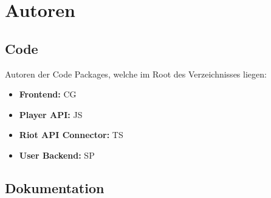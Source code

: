 \section{Autoren}
\subsection{Code}
Autoren der Code Packages, welche im Root des Verzeichnisses liegen:
\begin{itemize}
\item \textbf{Frontend:} CG
\item \textbf{Player API:} JS
\item \textbf{Riot API Connector:} TS
\item \textbf{User Backend:} SP
\end{itemize}

\subsection{Dokumentation}
